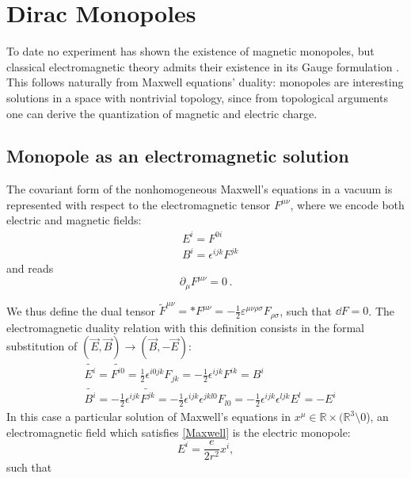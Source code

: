 \documentclass[main.tex]{subfiles}
\begin{document}
\section{Dirac Monopoles}

To date no experiment has shown the existence of magnetic monopoles, but classical electromagnetic theory admits their existence in its Gauge formulation \cite{Dirac}.
This follows naturally from Maxwell equations' duality: monopoles are interesting solutions in a space with nontrivial topology, since from topological arguments one can derive the quantization of magnetic and electric charge.

\subsection{Monopole as an electromagnetic solution}

The covariant form of the nonhomogeneous Maxwell's equations in a vacuum is represented with respect to the electromagnetic tensor $F^{\mu \nu}$, where we encode both electric and magnetic fields:
%
\begin{align}
&E^i=F^{0i}\\
&B^i=\epsilon^{ijk}F^{jk}
\end{align}
%
and reads
%
\begin{equation}\label{Maxwell}
\partial_{\mu}F^{\mu \nu}=0\,.
\end{equation}

We thus define the dual tensor
$\tilde{F}^{\mu\nu}=*F^{\mu\nu}=-\frac{1}{2}\varepsilon^{\mu \nu \rho \sigma}F_{\rho \sigma}$,
such that $\dd{F}=0$.
The electromagnetic duality relation with this definition consists in the formal substitution of $(\vec E,\vec B)\to(\vec B,-\vec E)$:
%
\begin{align}
&\tilde{E^i}=\tilde{F^{i0}}=\frac{1}{2}\epsilon^{i0jk}F_{jk}=-\frac{1}{2}\epsilon^{ijk}F^{ik}=B^i\\
&\tilde{B^i}=-\frac{1}{2}\epsilon^{ijk}\tilde{F^{jk}}=-\frac{1}{2}\epsilon^{ijk}\epsilon^{jkl0}F_{l0}=-\frac{1}{2}\epsilon^{ijk}\epsilon^{ljk}E^l=-E^i
\end{align}
%
In this case a particular solution of Maxwell's equations in $x^\mu \in \mathbb R \times (\mathbb{R}^3 \setminus \qty{0}$), \ie an electromagnetic field which satisfies \eqref{Maxwell} is the electric monopole:
%
\begin{equation}\label{ElectricMonopole}
E^i=\frac{e}{2r^2}x^i,
\end{equation}
such that
\end{document}
